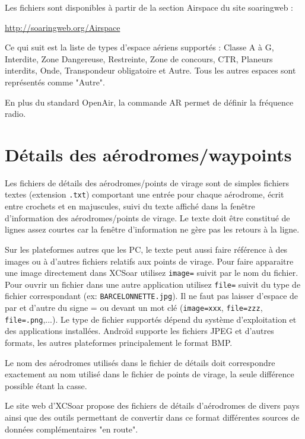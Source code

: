 Les fichiers sont disponibles à partir de la section Airspace du site soaringweb :

{\href{http://soaringweb.org/Airspace/}{http://soaringweb.org/Airspace}}

Ce qui suit est la liste de types d'espace aériens supportés : Classe A à G, Interdite, Zone Dangereuse, Restreinte, Zone de concours, CTR, Planeurs interdits, Onde, Transpondeur obligatoire et Autre. Tous les autres espaces sont représentés comme "Autre".

En plus du standard OpenAir, la commande AR permet de définir la fréquence radio.

\section{Détails des aérodromes/waypoints}\label{sec:Airfield-details}

Les fichiers de détails des aérodromes/points de virage sont de simples fichiers textes (extension \verb|.txt|) comportant une entrée pour chaque aérodrome, écrit entre crochets et en majuscules, suivi du texte affiché dans la fenêtre d'information des aérodromes/points de virage. Le texte doit être constitué de lignes assez courtes car la fenêtre d'information ne gère pas les retours à la ligne.

Sur les plateformes autres que les PC, le texte peut aussi faire référence à des images ou à d'autres fichiers relatifs aux points de virage. Pour faire apparaitre une image directement dans XCSoar utilisez \verb|image=| suivit par le nom du fichier. Pour ouvrir un fichier dans une autre application utilisez \verb|file=| suivit du type de fichier correspondant (ex: \verb|BARCELONNETTE.jpg|). Il ne faut pas laisser d'espace de par et d'autre du signe = ou devant un mot clé (\verb|image=xxx|, 
 \verb|file=zzz|, \verb|file=.png|,...). Le type de fichier supportés dépend du système d'exploitation et des applications installées. Androïd supporte les fichiers JPEG et d'autres formats, les autres plateformes principalement le format BMP.

Le nom des aérodromes utilisés dans le fichier de détails doit correspondre exactement au nom utilisé dans le fichier de points de virage, la seule différence possible étant la casse.

Le site web d'XCSoar propose des fichiers de détails d'aérodromes de divers pays ainsi que des outils permettant de convertir dans ce format différentes sources de données complémentaires "en route".

